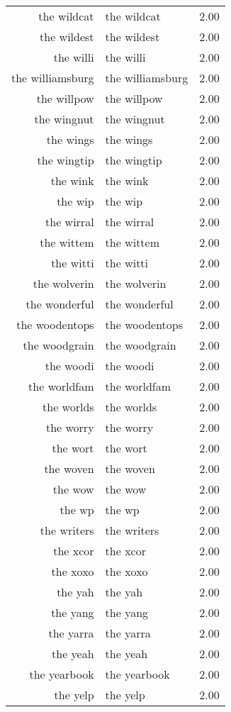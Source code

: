 \begin{table}[ht]
\begin{tabular}{rlr}
  the wildcat & the wildcat & 2.00 \\ 
  the wildest & the wildest & 2.00 \\ 
  the willi & the willi & 2.00 \\ 
  the williamsburg & the williamsburg & 2.00 \\ 
  the willpow & the willpow & 2.00 \\ 
  the wingnut & the wingnut & 2.00 \\ 
  the wings & the wings & 2.00 \\ 
  the wingtip & the wingtip & 2.00 \\ 
  the wink & the wink & 2.00 \\ 
  the wip & the wip & 2.00 \\ 
  the wirral & the wirral & 2.00 \\ 
  the wittem & the wittem & 2.00 \\ 
  the witti & the witti & 2.00 \\ 
  the wolverin & the wolverin & 2.00 \\ 
  the wonderful & the wonderful & 2.00 \\ 
  the woodentops & the woodentops & 2.00 \\ 
  the woodgrain & the woodgrain & 2.00 \\ 
  the woodi & the woodi & 2.00 \\ 
  the worldfam & the worldfam & 2.00 \\ 
  the worlds & the worlds & 2.00 \\ 
  the worry & the worry & 2.00 \\ 
  the wort & the wort & 2.00 \\ 
  the woven & the woven & 2.00 \\ 
  the wow & the wow & 2.00 \\ 
  the wp & the wp & 2.00 \\ 
  the writers & the writers & 2.00 \\ 
  the xcor & the xcor & 2.00 \\ 
  the xoxo & the xoxo & 2.00 \\ 
  the yah & the yah & 2.00 \\ 
  the yang & the yang & 2.00 \\ 
  the yarra & the yarra & 2.00 \\ 
  the yeah & the yeah & 2.00 \\ 
  the yearbook & the yearbook & 2.00 \\ 
  the yelp & the yelp & 2.00 \\ 

\end{tabular}
\end{table}
